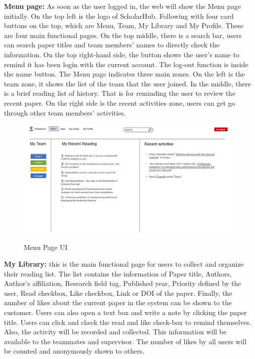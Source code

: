 \textbf {Menu page:} As soon as the user logged in, the web will show the Menu page initially. On the top left is the logo of ScholarHub. Following with four card buttons on the top, which are Menu, Team, My Library and My Profile. These are four main functional pages. On the top middle, there is a search bar, users can search paper titles and team members’ names to directly check the information. On the top right-hand side, the button shows the user’s name to remind it has been login with the current account. The log-out function is inside the name button. The Menu page indicates three main zones. On the left is the team zone, it shows the list of the team that the user joined. In the middle, there is a brief reading list of history. That is for reminding the user to review the recent paper. On the right side is the recent activities zone, users can get go through other team members' activities.

\begin{figure}[htp]
	\centering
	\includegraphics[width=\textwidth]{./img/UI MainPage.jpg}
	\caption{Menu Page UI}
	\label{fig:Memu Page}
\end{figure}

\textbf {My Library:} this is the main functional page for users to collect and organize their reading list. The list contains the information of Paper title, Authors, Author’s affiliation, Research field tag, Published year, Priority defined by the user, Read checkbox, Like checkbox, Link or DOI of the paper. Finally, the number of likes about the current paper in the system can be shown to the customer. Users can also open a text box and write a note by clicking the paper title. Users can click and check the read and like check-box to remind themselves. Also, the activity will be recorded and collected. This information will be available to the teammates and supervisor. The number of likes by all users will be counted and anonymously shown to others.


